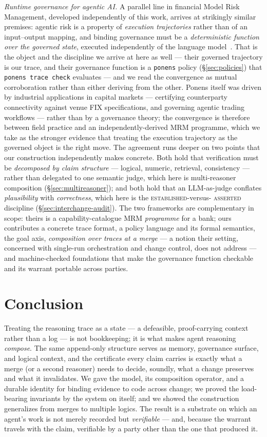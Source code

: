 \documentclass[11pt]{article}
\newcommand{\codeus}{\textunderscore\penalty100\relax}
\newcommand{\code}[1]{\texttt{\let\_\codeus #1}}
\begin{document}
\emph{Runtime governance for agentic AI.} A parallel line in financial Model Risk Management, developed
independently of this work, arrives at strikingly similar premises: agentic risk is a property of
\emph{execution trajectories} rather than of an input--output mapping, and binding governance must be a
\emph{deterministic function over the governed state}, executed independently of the language
model~\cite{szpruch,fixgov}. That is the object and the discipline we arrive at here as well --- their
governed trajectory is our trace, and their governance function is a \code{ponens} policy
(\S\ref{sec:policies}) that \code{ponens trace check} evaluates --- and we read the convergence as mutual
corroboration rather than either deriving from the other. Ponens itself was driven by industrial applications
in capital markets --- certifying counterparty connectivity against venue FIX specifications, and governing
agentic trading workflows --- rather than by a governance theory; the convergence is therefore between field
practice and an independently-derived MRM programme, which we take as the stronger evidence that treating the
execution trajectory as the governed object is the right move. The agreement runs deeper on two points that
our construction independently makes concrete. Both hold that verification must be \emph{decomposed by claim
structure} --- logical, numeric, retrieval, consistency --- rather than delegated to one semantic judge,
which here is multi-reasoner composition (\S\ref{sec:multireasoner}); and both hold that an LLM-as-judge
conflates \emph{plausibility} with \emph{correctness}, which here is the \textsc{established}-versus-%
\textsc{asserted} discipline (\S\ref{sec:interchange-audit}). The two frameworks are complementary in scope:
theirs is a capability-catalogue MRM \emph{programme} for a bank; ours contributes a concrete trace format, a
policy language and its formal semantics, the goal axis, \emph{composition over traces at a merge} --- a
notion their setting, concerned with single-run orchestration and change control, does not address --- and
machine-checked foundations that make the governance function checkable and its warrant portable across
parties.

\section{Conclusion}

Treating the reasoning trace as a state --- a defeasible, proof-carrying context rather than a log --- is not
bookkeeping; it is what makes agent reasoning \emph{compose}. The same append-only structure serves as
memory, governance surface, and logical context, and the certificate every claim carries is exactly what a
merge (or a second reasoner) needs to decide, soundly, what a change preserves and what it invalidates. We
gave the model, its composition operator, and a durable identity for binding evidence to code across change;
we proved the load-bearing invariants by the system on itself; and we showed the construction generalizes
from merges to multiple logics. The result is a substrate on which an agent's work is not merely recorded but
\emph{verifiable} --- and, because the warrant travels with the claim, verifiable by a party other than the
one that produced it.
\end{document}
